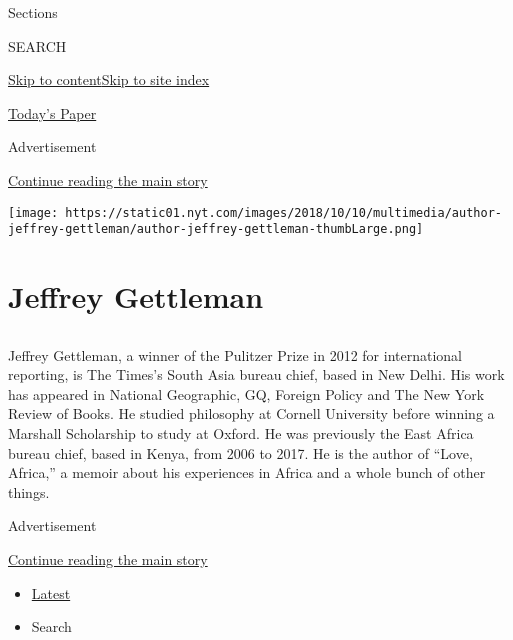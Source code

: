 Sections

SEARCH

\protect\hyperlink{site-content}{Skip to
content}\protect\hyperlink{site-index}{Skip to site index}

\href{https://myaccount.nytimes.com/auth/login?response_type=cookie\&client_id=vi}{}

\href{https://www.nytimes.com/section/todayspaper}{Today's Paper}

Advertisement

\protect\hyperlink{after-top}{Continue reading the main story}

\texttt{[image: https://static01.nyt.com/images/2018/10/10/multimedia/author-jeffrey-gettleman/author-jeffrey-gettleman-thumbLarge.png]}

\hypertarget{jeffrey-gettleman}{%
\section{Jeffrey Gettleman}\label{jeffrey-gettleman}}

\subsection{}

Jeffrey Gettleman, a winner of the Pulitzer Prize in 2012 for
international reporting, is The Times's South Asia bureau chief, based
in New Delhi. His work has appeared in National Geographic, GQ, Foreign
Policy and The New York Review of Books. He studied philosophy at
Cornell University before winning a Marshall Scholarship to study at
Oxford. He was previously the East Africa bureau chief, based in Kenya,
from 2006 to 2017. He is the author of ``Love, Africa,'' a memoir about
his experiences in Africa and a whole bunch of other things.

Advertisement

\protect\hyperlink{after-mid1}{Continue reading the main story}

\begin{itemize}
\tightlist
\item
  \protect\hyperlink{stream-panel}{Latest}
\item
  Search
\end{itemize}

